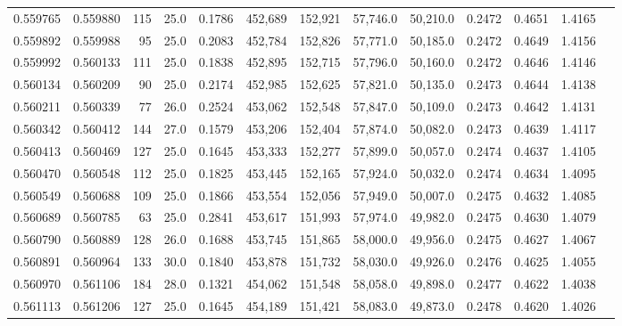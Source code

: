 \begin{tabular}{rrrrrrrrrrrrr}
0.559765 & 0.559880 &   115 & 25.0 &                                     0.1786 & 452,689 & 152,921 &  57,746.0 &  50,210.0 & 0.2472 & 0.4651 & 1.4165 \\
0.559892 & 0.559988 &    95 & 25.0 &                                     0.2083 & 452,784 & 152,826 &  57,771.0 &  50,185.0 & 0.2472 & 0.4649 & 1.4156 \\
0.559992 & 0.560133 &   111 & 25.0 &                                     0.1838 & 452,895 & 152,715 &  57,796.0 &  50,160.0 & 0.2472 & 0.4646 & 1.4146 \\
0.560134 & 0.560209 &    90 & 25.0 &                                     0.2174 & 452,985 & 152,625 &  57,821.0 &  50,135.0 & 0.2473 & 0.4644 & 1.4138 \\
0.560211 & 0.560339 &    77 & 26.0 &                                     0.2524 & 453,062 & 152,548 &  57,847.0 &  50,109.0 & 0.2473 & 0.4642 & 1.4131 \\
0.560342 & 0.560412 &   144 & 27.0 &                                     0.1579 & 453,206 & 152,404 &  57,874.0 &  50,082.0 & 0.2473 & 0.4639 & 1.4117 \\
0.560413 & 0.560469 &   127 & 25.0 &                                     0.1645 & 453,333 & 152,277 &  57,899.0 &  50,057.0 & 0.2474 & 0.4637 & 1.4105 \\
0.560470 & 0.560548 &   112 & 25.0 &                                     0.1825 & 453,445 & 152,165 &  57,924.0 &  50,032.0 & 0.2474 & 0.4634 & 1.4095 \\
0.560549 & 0.560688 &   109 & 25.0 &                                     0.1866 & 453,554 & 152,056 &  57,949.0 &  50,007.0 & 0.2475 & 0.4632 & 1.4085 \\
0.560689 & 0.560785 &    63 & 25.0 &                                     0.2841 & 453,617 & 151,993 &  57,974.0 &  49,982.0 & 0.2475 & 0.4630 & 1.4079 \\
0.560790 & 0.560889 &   128 & 26.0 &                                     0.1688 & 453,745 & 151,865 &  58,000.0 &  49,956.0 & 0.2475 & 0.4627 & 1.4067 \\
0.560891 & 0.560964 &   133 & 30.0 &                                     0.1840 & 453,878 & 151,732 &  58,030.0 &  49,926.0 & 0.2476 & 0.4625 & 1.4055 \\
0.560970 & 0.561106 &   184 & 28.0 &                                     0.1321 & 454,062 & 151,548 &  58,058.0 &  49,898.0 & 0.2477 & 0.4622 & 1.4038 \\
0.561113 & 0.561206 &   127 & 25.0 &                                     0.1645 & 454,189 & 151,421 &  58,083.0 &  49,873.0 & 0.2478 & 0.4620 & 1.4026 \\

\end{tabular}
